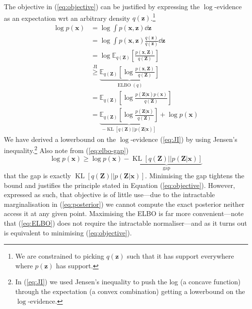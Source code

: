 \documentclass[11pt]{article}
\DeclareMathOperator{\KL}{KL}
\DeclareMathOperator{\ELBO}{ELBO}
\newcommand{\x}{\ensuremath{\mathbf x}}
\newcommand{\z}{\ensuremath{\mathbf z}}
\newcommand{\Z}{\ensuremath{\mathbf Z}}
\begin{document}
The objective in (\ref{eq:objective}) can be justified by expressing the $\log$-evidence as an expectation wrt an arbitrary density $q(\z)$.\footnote{We are constrained to picking $q(\z)$ such that it has support everywhere where $p(\z)$ has support.}
\begin{subequations}\label{eq:log-evidence}
\begin{align}
\log p(\x) &= \log \int p(\x, \z) \dd \z \\
&= \log \int p(\x, \z)\frac{q(\z)}{q(\z)} \dd \z \\
&= \log \mathbb E_{q(\Z)}\left[\frac{p(\x,\Z)}{q(\Z)}\right] \\
&\overset{\text{JI}}{\ge} \underbrace{\mathbb E_{q(\Z)}\left[\log \frac{p(\x,\Z)}{q(\Z)}\right]}_{\ELBO(q)} \label{eq:JI} \\
&= \mathbb E_{q(\Z)}\left[\log \frac{p(\Z|\x)p(\x)}{q(\Z)}\right] \\
&= \underbrace{\mathbb E_{q(\Z)}\left[\log \frac{p(\Z|\x)}{q(\Z)}\right]}_{-\KL\left[q(\Z) || p(\Z|\x)\right]} + \log p(\x) \label{eq:elbo-gap}
\end{align}
\end{subequations}
We have derived a lowerbound on the $\log$-evidence (\ref{eq:JI}) by using Jensen's inequality.\footnote{In (\ref{eq:JI}) we used Jensen's inequality to push the log (a concave function) through the expectation (a convex combination) getting a lowerbound on the $\log$-evidence.}
Also note from (\ref{eq:elbo-gap})  
\begin{equation}\label{eq:gap}
\log p(\x) \ge \log p(\x) -\underbrace{\KL\left[q(\Z) || p(\Z|\x)\right]}_{\text{gap}}
\end{equation}
that the gap is exactly $\KL[q(\Z)||p(\Z|\x)]$.
Minimising the gap tightens the bound and justifies the principle stated in Equation (\ref{eq:objective}).
However, expressed as such, that objective is of little use---due to the intractable marginalisation in (\ref{eq:posterior}) we cannot compute the exact posterior neither access it at any given point. 
Maximising the ELBO is far more convenient---note that (\ref{eq:ELBO}) does not require the intractable normaliser---and as it turns out is equivalent to minimising (\ref{eq:objective}).
\end{document}
